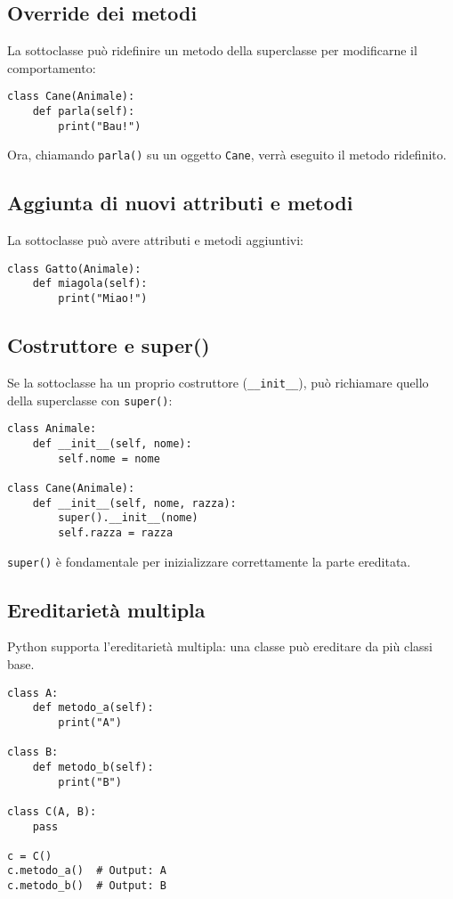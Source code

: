 \documentclass[a4paper,12pt]{article}
\begin{document}
\subsection*{Override dei metodi}
La sottoclasse può ridefinire un metodo della superclasse per modificarne il comportamento:
\begin{lstlisting}
class Cane(Animale):
    def parla(self):
        print("Bau!")
\end{lstlisting}
Ora, chiamando \texttt{parla()} su un oggetto \texttt{Cane}, verrà eseguito il metodo ridefinito.

\subsection*{Aggiunta di nuovi attributi e metodi}
La sottoclasse può avere attributi e metodi aggiuntivi:
\begin{lstlisting}
class Gatto(Animale):
    def miagola(self):
        print("Miao!")
\end{lstlisting}

\subsection*{Costruttore e super()}
Se la sottoclasse ha un proprio costruttore (\texttt{\_\_init\_\_}), può richiamare quello della superclasse con \texttt{super()}:
\begin{lstlisting}
class Animale:
    def __init__(self, nome):
        self.nome = nome

class Cane(Animale):
    def __init__(self, nome, razza):
        super().__init__(nome)
        self.razza = razza
\end{lstlisting}
\texttt{super()} è fondamentale per inizializzare correttamente la parte ereditata.

\subsection*{Ereditarietà multipla}
Python supporta l'ereditarietà multipla: una classe può ereditare da più classi base.
\begin{lstlisting}
class A:
    def metodo_a(self):
        print("A")

class B:
    def metodo_b(self):
        print("B")

class C(A, B):
    pass

c = C()
c.metodo_a()  # Output: A
c.metodo_b()  # Output: B
\end{lstlisting}
\end{document}
